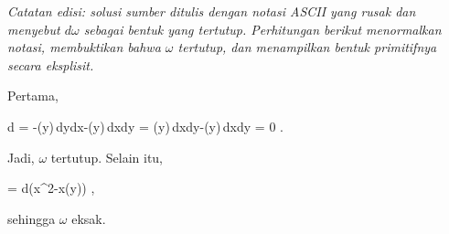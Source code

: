 \textit{Catatan edisi: solusi sumber ditulis dengan notasi ASCII yang rusak
dan menyebut $d\omega$ sebagai bentuk yang tertutup. Perhitungan berikut
menormalkan notasi, membuktikan bahwa $\omega$ tertutup, dan menampilkan
bentuk primitifnya secara eksplisit.}

Pertama,

\mavergleichskettealign
{\vergleichskettealign
{d\omega
}
{ =} { -\cos(y)\,dy\wedge dx-\cos(y)\,dx\wedge dy
}
{ =} { \cos(y)\,dx\wedge dy-\cos(y)\,dx\wedge dy
}
{ =} {0
}
{ } {}
}
{}
{}{.}

Jadi, $\omega$ tertutup. Selain itu,

\mavergleichskettedisp
{\vergleichskette
{\omega
}
{ =} {d\left(x^2-x\sin(y)\right)
}
{ } {
}
{ } {
}
{ } {
}
}
{}{}{,}

sehingga $\omega$ eksak.
